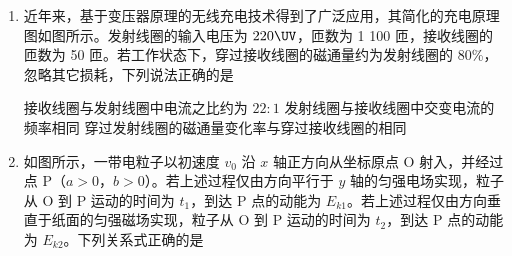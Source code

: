 \documentclass[\gkver]{gaokaozhenti}
\begin{document}
\begin{enumerate}
{	此时出射方向与入射方向相同，即出射方向与入射方向的夹角为 $\theta=0^{\circ}$。

	通过以上分析可知当粒子从下部分磁场射出时，需满足

	$v=\frac{qBL}{(2n-1)m}=\frac{1}{2n-1}kBL$（$n=1,2,3\cdots$）

	此时出射方向与入射方向的夹角为 $\theta=60^{\circ}$；

	当粒子从上部分磁场射出时，需满足

	$v=\frac{qBL}{2nm}=\frac{1}{2n}kBL$（$n=1,2,3\cdots$）

	此时出射方向与入射方向的夹角为 $\theta=0^{\circ}$。

	故可知 BC 正确，AD 错误。

	故选 BC。
}

\item
近年来，基于变压器原理的无线充电技术得到了广泛应用，其简化的充电原理图如图所示。发射线圈的输入电压为 $220\UV$，匝数为 1 100 匝，接收线圈的匝数为 50 匝。若工作状态下，穿过接收线圈的磁通量约为发射线圈的 80\%，忽略其它损耗，下列说法正确的是 


{接收线圈与发射线圈中电流之比约为 $22:1$}
{发射线圈与接收线圈中交变电流的频率相同}
{穿过发射线圈的磁通量变化率与穿过接收线圈的相同}


\item
如图所示，一带电粒子以初速度 $v_{0}$ 沿 $x$ 轴正方向从坐标原点 O 射入，并经过点 P（$a > 0$，$b > 0$）。若上述过程仅由方向平行于 $y$ 轴的匀强电场实现，粒子从 O 到 P 运动的时间为 $t_{1}$，到达 P 点的动能为 $E_{k1}$。若上述过程仅由方向垂直于纸面的匀强磁场实现，粒子从 O 到 P 运动的时间为 $t_{2}$，到达 P 点的动能为 $E_{k2}$。下列关系式正确的是 


\end{enumerate}
\end{document}
